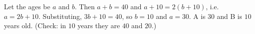 Let the ages be $a$ and $b$. Then $a+b=40$ and $a+10=2(b+10)$, i.e.\ $a=2b+10$. Substituting, $3b+10=40$, so $b=10$ and $a=30$. A is $\boxed{30}$ and B is $\boxed{10}$ years old. (Check: in $10$ years they are $40$ and $20$.)
